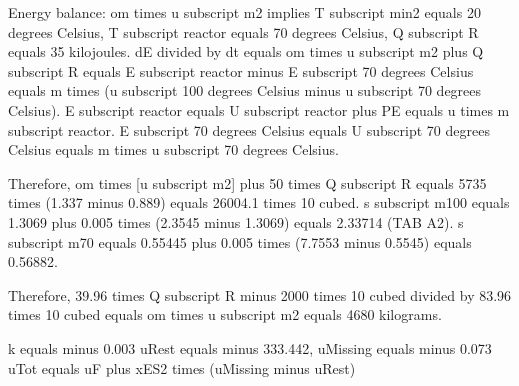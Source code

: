 Energy balance:
om times u subscript m2 implies T subscript min2 equals 20 degrees Celsius, T subscript reactor equals 70 degrees Celsius, Q subscript R equals 35 kilojoules.
dE divided by dt equals om times u subscript m2 plus Q subscript R equals E subscript reactor minus E subscript 70 degrees Celsius equals m times (u subscript 100 degrees Celsius minus u subscript 70 degrees Celsius).
E subscript reactor equals U subscript reactor plus PE equals u times m subscript reactor.
E subscript 70 degrees Celsius equals U subscript 70 degrees Celsius equals m times u subscript 70 degrees Celsius.

Therefore, om times [u subscript m2] plus 50 times Q subscript R equals 5735 times (1.337 minus 0.889) equals 26004.1 times 10 cubed.
s subscript m100 equals 1.3069 plus 0.005 times (2.3545 minus 1.3069) equals 2.33714 (TAB A2).
s subscript m70 equals 0.55445 plus 0.005 times (7.7553 minus 0.5545) equals 0.56882.

Therefore, 39.96 times Q subscript R minus 2000 times 10 cubed divided by 83.96 times 10 cubed equals om times u subscript m2 equals 4680 kilograms.

k equals minus 0.003
uRest equals minus 333.442, uMissing equals minus 0.073
uTot equals uF plus xES2 times (uMissing minus uRest)